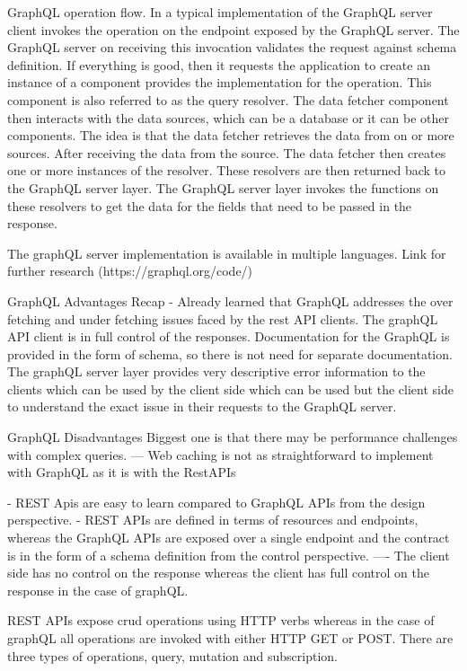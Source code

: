 GraphQL operation flow.
In a typical implementation of the GraphQL server client invokes the operation on the endpoint exposed by the GraphQL server.
The GraphQL server on receiving this invocation validates the request against schema definition.
If everything is good, then it requests the application to create an instance of a component provides the implementation for the operation.
This component is also referred to as the query resolver.
The data fetcher component then interacts with the data sources, which can be a database or it can be other components.
The idea is that the data fetcher retrieves the data from on or more sources.
After receiving the data from the source.
The data fetcher then creates one or more instances of the resolver.
These resolvers are then returned back to the GraphQL server layer.
The GraphQL server layer invokes the functions on these resolvers to get the data for the fields that need to be passed in the response.

The graphQL server implementation is available in multiple languages.
Link for further research (https://graphql.org/code/)

GraphQL Advantages
Recap - Already learned that GraphQL addresses the over fetching and under fetching issues faced by the rest API clients.
The graphQL API client is in full control of the responses.
Documentation for the GraphQL is provided in the form of schema, so there is not need for separate documentation.
The graphQL server layer provides very descriptive error information to the clients which can be used by the client side which can be used but the client side to understand the exact issue in their requests to the GraphQL server.

GraphQL Disadvantages
Biggest one is that there may be performance challenges with complex queries.
--- Web caching is not as straightforward to implement with GraphQL as it is with the RestAPIs

- REST Apis are easy to learn compared to GraphQL APIs from the design perspective.
- REST APIs are defined in terms of resources and endpoints, whereas the GraphQL APIs are exposed over a single endpoint and the contract is in the form of a schema definition from the control perspective.
---- The client side has no control on the response whereas the client has full control on the response in the case of graphQL.

REST APIs expose crud operations using HTTP verbs whereas in the case of graphQL all operations are invoked with either HTTP GET or POST.
There are three types of operations, query, mutation and subscription.

